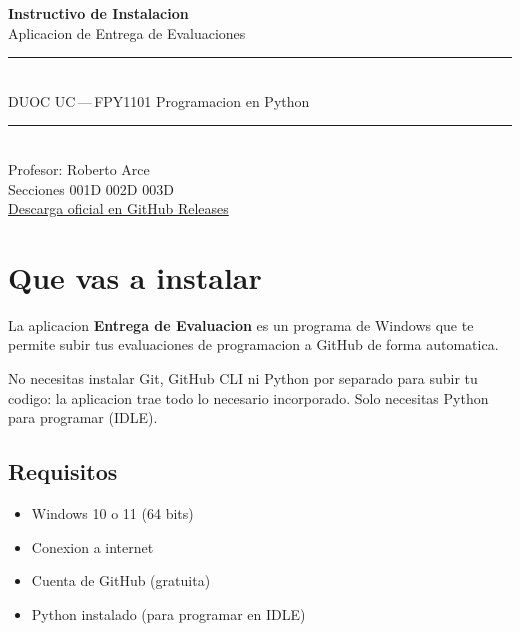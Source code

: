 \documentclass[11pt,a4paper,oneside]{report}
\begin{document}
\sloppy

\begin{titlepage}
\centering
\vspace*{2cm}
{\color{primary}\Huge\bfseries Instructivo de Instalacion}\\[8pt]
{\color{accent}\LARGE Aplicacion de Entrega de Evaluaciones}\\[2.5cm]
\rule{0.7\textwidth}{0.8pt}\\[10pt]
{\large DUOC UC\,---\,FPY1101 Programacion en Python}\\[10pt]
\rule{0.7\textwidth}{0.8pt}\\[3cm]
{\large Profesor: Roberto Arce}\\[8pt]
{\large Secciones 001D \textbullet{} 002D \textbullet{} 003D}\\[3cm]
{\small \href{https://github.com/Robbyfuu/entrega-evaluacion-github/releases/latest}{Descarga oficial en GitHub Releases}}\\
\vfill
\end{titlepage}

\tableofcontents
\clearpage

\chapter{Que vas a instalar}

La aplicacion \textbf{Entrega de Evaluacion} es un programa de Windows que te
permite subir tus evaluaciones de programacion a GitHub de forma automatica.

\begin{notebox}[Ventaja]
No necesitas instalar Git, GitHub CLI ni Python por separado para subir tu
codigo: la aplicacion trae todo lo necesario incorporado. Solo necesitas
Python para programar (IDLE).
\end{notebox}

\section{Requisitos}
\begin{itemize}
  \item Windows 10 o 11 (64 bits)
  \item Conexion a internet
  \item Cuenta de GitHub (gratuita)
  \item Python instalado (para programar en IDLE)
\end{itemize}
\end{document}
